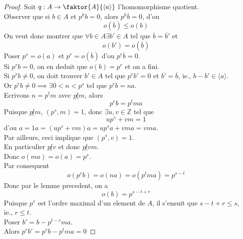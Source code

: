 \documentclass[../main.tex]{subfiles}
\begin{document}
\begin{proof}
Soit $q: A \to \faktor{A }{\langle a\rangle}$ l'homomorphisme quotient.\\
Observer que si $b \in A$ et $p^{k}b = 0$, alors $p^{k} \overline{b}= 0$, d'ou
\[ 
o(  \overline{b}) \leq  o( b) 
\]
On veut donc montrer que $\forall b \in A \exists b' \in A$ tel que $ \overline{b}= \overline{b'}$ et 
\[ 
o( b')  = o( \overline{b}) 
\]
Poser $p^{s}= o( a) $ et $p^{r}= o( \overline{b}) $ d'ou $p^{r}\overline{b}=0$.\\
Si $p^{r}b =0$, on en deduit que $o( b) = p^{r}$ et on a fini.\\
Si $p^{r}b\neq 0$, on doit trouver $b' \in A$ tel que $p^{r}b'=0$ et $ \overline{b'}= \overline{b}$, ie., $b- b' \in \langle a \rangle$.\\
Or $p^{r}b \neq 0 \implies \exists 0< n < p^{s}$ tel que $p^{r}b = na$.\\
Ecrivons $n = p^{t}m$ avec $p\not|m$, alors
\[ 
p^{r}b = p^{t}m a
\]
Puisque $p \not| m$, $( p^{s},m) = 1$, donc $\exists u,v \in \mathbb{Z}$ tel que
\[ 
up^{s}+ vm = 1
\]
d'ou $a = 1 a = ( up^{s}+ vm ) a = up^{s}a + vma = vma $.\\
Par ailleurs, ceci implique que $( p^{s},v) = 1$.\\
En particulier $p\not| v$ et donc $p\not| vm$.\\
Donc $o( ma) = o( a) = p^{s}$.\\
Par consequent
\[ 
o( p^{r}b) = o( na) = o( p^{t}ma) = p^{s-t}
\]
Donc par le lemme precedent, on a
\[ 
o( b) = p^{s-t+ r}
\]
Puisque $p^{s}$ est l'ordre maximal d'un element de $A$, il s'ensuit que $s-t+r \leq  s$, ie., $r \leq  t$.\\
Poser $b' = b - p^{t-r}ma $. \\
Alors $p^{r}b' = p^{r}b - p^{t}ma = 0$ 

\end{proof}



	
\end{document}
